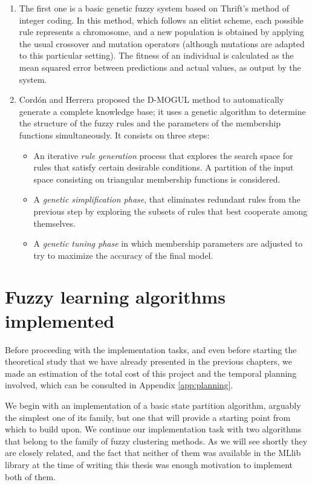 \begin{enumerate}[1.]
  \item The first one is a basic genetic fuzzy system based on Thrift's method \cite{thrift1991genetic} of integer coding. In this method, which follows an elitist scheme, each possible rule represents a chromosome, and a new population is obtained by applying the usual crossover and mutation operators (although mutations are adapted to this particular setting). The fitness of an individual is calculated as the mean squared error between predictions and actual values, as output by the system.
  \item Cordón and Herrera proposed the D-MOGUL method \cite{cordon1997three} to automatically generate a complete knowledge base; it uses a genetic algorithm to determine the structure of the fuzzy rules and the parameters of the membership functions simultaneously. It consists on three steps:
  \begin{itemize}
    \item An iterative \textit{rule generation} process that explores the search space for rules that satisfy certain desirable conditions. A partition of the input space consisting on triangular membership functions is considered.
    \item A \textit{genetic simplification phase}, that eliminates redundant rules from the previous step by exploring the subsets of rules that best cooperate among themselves.
    \item A \textit{genetic tuning phase} in which membership parameters are adjusted to try to maximize the accuracy of the final model.
  \end{itemize}
\end{enumerate}

\section{Fuzzy learning algorithms implemented}

Before proceeding with the implementation tasks, and even before starting the theoretical study that we have already presented in the previous chapters, we made an estimation of the total cost of this project and the temporal planning involved, which can be consulted in Appendix \ref{app:planning}.

We begin with an implementation of a basic state partition algorithm, arguably the simplest one of its family, but one that will provide a starting point from which to build upon. We continue our implementation task with two algorithms that belong to the family of fuzzy clustering methods. As we will see shortly they are closely related, and the fact that neither of them was available in the MLlib library at the time of writing this thesis was enough motivation to implement both of them.

